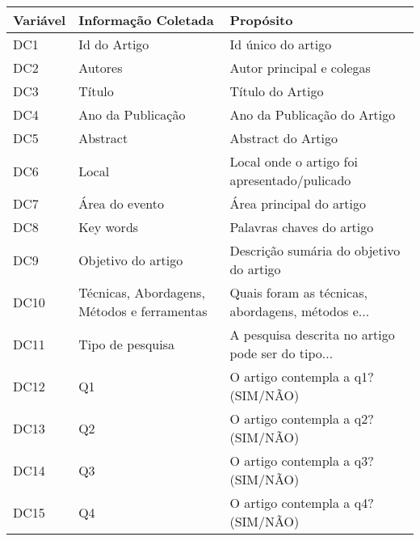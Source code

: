 \begin{tabular}{lll}
\toprule
Variável &                          Informação Coletada &                                          Propósito \\
\midrule
     DC1 &                                 Id do Artigo &                                 Id único do artigo \\
     DC2 &                                      Autores &                          Autor principal e colegas \\
     DC3 &                                       Título &                                   Título do Artigo \\
     DC4 &                            Ano da Publicação &                        Ano da Publicação do Artigo \\
     DC5 &                                     Abstract &                                 Abstract do Artigo \\
     DC6 &                                        Local &       Local onde o artigo foi apresentado/pulicado \\
     DC7 &                               Área do evento &                           Área principal do artigo \\
     DC8 &                                    Key words &                          Palavras chaves do artigo \\
     DC9 &                           Objetivo do artigo &            Descrição sumária do objetivo do artigo \\
    DC10 &  Técnicas, Abordagens, Métodos e ferramentas &  Quais foram as técnicas, abordagens, métodos e... \\
    DC11 &                             Tipo de pesquisa &  A pesquisa descrita no artigo pode ser do tipo... \\
    DC12 &                                           Q1 &                 O artigo contempla a q1? (SIM/NÃO) \\
    DC13 &                                           Q2 &                 O artigo contempla a q2? (SIM/NÃO) \\
    DC14 &                                           Q3 &                 O artigo contempla a q3? (SIM/NÃO) \\
    DC15 &                                           Q4 &                 O artigo contempla a q4? (SIM/NÃO) \\
\bottomrule
\end{tabular}
